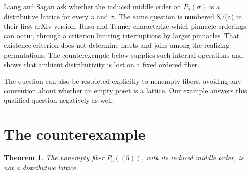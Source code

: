 \documentclass[11pt]{article}
\newtheorem{theorem}{Theorem}
\begin{document}
Liang and Sagan \cite[Question~8.6(a)]{LS} ask whether the induced middle
order on $P_n(\sigma)$ is a distributive lattice for every $n$ and
$\sigma$. The same question is numbered 8.7(a) in their first arXiv
version. Rusu and Tenner \cite{RT} characterize which pinnacle orderings
can occur, through a criterion limiting interruptions by larger
pinnacles. That existence criterion does not determine meets and joins
among the realizing permutations. The counterexample below supplies
such internal operations and shows that ambient distributivity is lost
on a fixed ordered fiber.

The question can also be restricted explicitly to nonempty fibers,
avoiding any convention about whether an empty poset is a lattice.
Our example answers this qualified question negatively as well.

\section{The counterexample}

\begin{theorem}\label{thm:main}
The nonempty fiber $P_5((5))$, with its induced middle order, is not a
distributive lattice.
\end{theorem}
\end{document}
